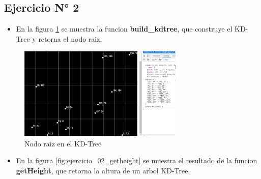 \documentclass{article}
\begin{document}
\clearpage
\subsection{Ejercicio N° 2}
\begin{itemize}
	\item En la figura \ref{fig:ejercicio_02_build_kdtree} se muestra la funcion \textbf{build\_kdtree}, que construye el KD-Tree y retorna el nodo raiz.
\end{itemize}

\begin{figure}[h!]
	\centering
	\includegraphics[width=0.7\textwidth]{img/ejercicio_02_build_kdtree.png}
	\caption{Nodo raiz en el KD-Tree}
	\label{fig:ejercicio_02_build_kdtree}
\end{figure}

\begin{itemize}
	\item En la figura \ref{fig:ejercicio_02_getheight} se muestra el resultado de la funcion \textbf{getHeight}, que retorna la altura de un arbol KD-Tree.
\end{itemize}
\end{document}
